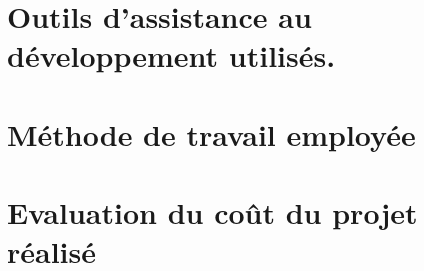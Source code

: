 
\section{Outils d'assistance au développement utilisés.}

\section{Méthode de travail employée}


\section{Evaluation du coût du projet réalisé}
